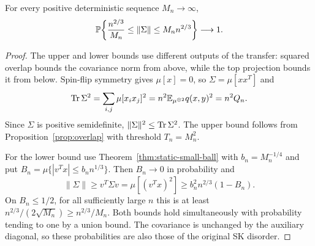 \begin{corollary}
\label{cor:covariance-scale}
For every positive deterministic sequence $M_n\to\infty$,
\[
 \mathbb P\!\left\{
 \frac{n^{2/3}}{M_n}\le\|\Sigma\|\le M_n n^{2/3}
 \right\}\longrightarrow1.
\]
\end{corollary}

\begin{proof}
The upper and lower bounds use different outputs of the transfer:
squared overlap bounds the covariance norm from above, while the top
projection bounds it from below. Spin-flip symmetry gives $\mu[x]=0$,
so $\Sigma=\mu[xx^T]$ and
\begin{equation}
 \operatorname{Tr}\Sigma^2
 =\sum_{i,j}\mu[x_ix_j]^2
 =n^2\mathbb E_{\mu^{\otimes2}}q(x,y)^2
 =n^2Q_n.
 \label{eq:orientation-covariance-trace}
\end{equation}
Since $\Sigma$ is positive semidefinite,
$\|\Sigma\|^2\le\operatorname{Tr}\Sigma^2$.  The upper bound follows from
Proposition~\ref{prop:overlap} with threshold $T_n=M_n^2$.

For the lower bound use Theorem~\ref{thm:static-small-ball} with
$b_n=M_n^{-1/4}$ and put
$B_n=\mu\{|v^Tx|\le b_n n^{1/3}\}$.  Then $B_n\to0$ in probability and
\[
 \|\Sigma\|\ge v^T\Sigma v
 =\mu[(v^Tx)^2]
 \ge b_n^2 n^{2/3}(1-B_n).
\]
On $B_n\le1/2$, for all sufficiently large $n$ this is at least
$n^{2/3}/(2\sqrt{M_n})\ge n^{2/3}/M_n$.
Both bounds hold simultaneously with probability tending to one by a
union bound.  The covariance is unchanged by the auxiliary diagonal,
so these probabilities are also those of the original SK disorder.
\end{proof}
